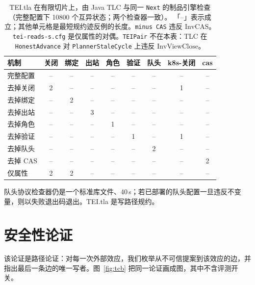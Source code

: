 \documentclass[acmsmall,manuscript,review,anonymous]{acmart}
\renewcommand{\_}{\discretionary{\textunderscore}{}{\textunderscore}}
\begin{document}
\begin{table}[t]
\centering
\small
\caption{{TEI.tla} 在有限切片上，由 {Java} {TLC} 与同一 \texttt{Next} 的制品引擎检查（完整配置下 10800 个互异状态；两个检查器一致）。
「--」表示成立；其他单元格是最短规约迹反例的长度。\texttt{minus CAS} 违反 $\mathrm{InvCAS}$。\texttt{tei-reads-s.cfg} 是仅属性的对偶。\texttt{TEIPair} 不在本表：{TLC} 在 \texttt{HonestAdvance} 对 \texttt{PlannerStaleCycle} 上违反 $\mathrm{InvViewClose}$。}
\label{tab:tlc}
\begin{tabular}{@{}lcccccccc@{}}
\hline
机制 & 关闭 & 绑定 & 出站 & 角色 & 验证 & 队头 & k8s-关闭 & cas \\
\hline
完整配置 & -- & -- & -- & -- & -- & -- & -- & -- \\
去掉关闭 & 2 & -- & -- & -- & -- & -- & 1 & -- \\
去掉绑定 & -- & 2 & -- & -- & -- & -- & -- & -- \\
去掉出站 & -- & -- & 3 & -- & -- & -- & -- & -- \\
去掉角色 & -- & -- & -- & 1 & -- & -- & -- & -- \\
去掉验证 & -- & -- & -- & -- & 1 & -- & 1 & -- \\
去掉队头 & -- & -- & -- & -- & -- & 2 & -- & -- \\
去掉 {CAS} & -- & -- & -- & -- & -- & -- & -- & 2 \\
仅属性 & 2 & 2 & -- & -- & -- & -- & -- & -- \\
\hline
\end{tabular}
\end{table}

队头协议检查器仍是一个标准库文件、40\,s；若已部署的队头配置一旦违反不变量，则以失败退出码退出。{TEI.tla} 是写路径规约。

\section{安全性论证}
\label{sec:argument}

该论证是路径论证：对每一次外部效应，我们枚举从不可信提案到该效应的边，并指出最后一条边的唯一写者。图~\ref{fig:tcb} 把同一论证画成图，其中不含评测开关。
\end{document}
